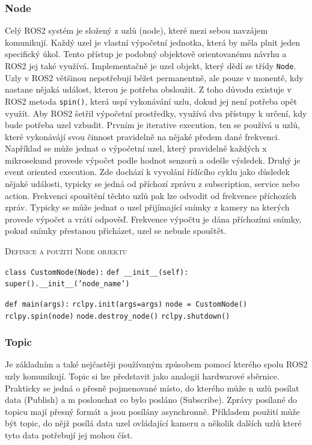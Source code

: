 \subsubsection*{Node}
Celý ROS2 systém je složený z uzlů (node), které mezi sebou navzájem komunikují. Každý uzel je vlastní výpočetní jednotka, která by měla plnit jeden specifický úkol. Tento přístup je podobný objektově orientovanému návrhu a ROS2 jej také využívá. Implementačně je uzel objekt, který dědí ze třídy \verb|Node|.
Uzly v ROS2 většinou nepotřebují běžet permanentně, ale pouze v monentě, kdy nastane nějaká událost, kterou je potřeba obsloužit. Z toho důvodu existuje v ROS2 metoda \verb|spin()|, která uspí vykonávání uzlu, dokud jej není potřeba opět využít. Aby ROS2 šetřil výpočetní prostředky, využívá dva přístupy k určení, kdy bude potřeba uzel vzbudit. Prvním je iterative execution, ten se používá u uzlů, které vykonávájí svou činnost pravidelně na nějaké předem dané frekvenci. Například se může jednat o výpočetní uzel, který pravidelně každých x mikrosekund provede výpočet podle hodnot senzorů a odešle výsledek.
Druhý je event oriented execution. Zde dochází k vyvolání řídícího cyklu jako důsledek nějaké události, typicky se jedná od příchozí zprávu z subscription, service nebo action. Frekvenci spouštění těchto uzlů pak lze odvodit od frekvence příchozích zpráv. Typicky se může jednat o uzel přijímající snímky z kamery na kterých provede výpočet a vrátí odpověď. Frekvence výpočtu je dána příchozími snímky, pokud snímky přestanou přicházet, uzel se nebude spouštět. \cite{ros2_introduction} \cite{ros2_documentation}

\begin{algorithm}[h!]
	\label{}
	\caption{\textsc{Definice a použití Node objektu}}
	
	\DontPrintSemicolon
	\SetAlgoNoLine
	\SetNlSty{}{}{:}
	\SetNlSkip{-1.1em}
	
	\BlankLine \Indp\Indpp
	
	\texttt{class CustomNode(Node):}\;
	\Indp\Indp
	\texttt{def \_\_init\_\_(self):}\;
	\Indp\Indp
	\texttt{super().\_\_init\_\_('node\_name')}\;
	\Indm\Indm\Indm\Indm
	
	\BlankLine
	
	\texttt{def main(args):}\;
	\Indp\Indp
	\texttt{rclpy.init(args=args)}\;
	\texttt{node = CustomNode()}\;
	\texttt{rclpy.spin(node)}\;
	\texttt{node.destroy\_node()}\;
	\texttt{rclpy.shutdown()}\;
\end{algorithm}

\subsubsection*{Topic}
Je základním a také nejčastěji používaným způsobem pomocí kterého spolu ROS2 uzly komunikují. Topic si lze představit jako analogii hardwarové sběrnice. Prakticky se jedná o přesně pojmenované místo, do kterého může n uzlů posílat data (Publish) a m poslouchat co bylo posláno (Subscribe). Zprávy posílané do topicu mají přesný formát a jsou posílány asynchronně. Příkladem použití může být topic, do nějž posílá data uzel ovládající kameru a několik dalších uzlů které tyto data potřebují jej mohou číst. \cite{ros2_introduction}


